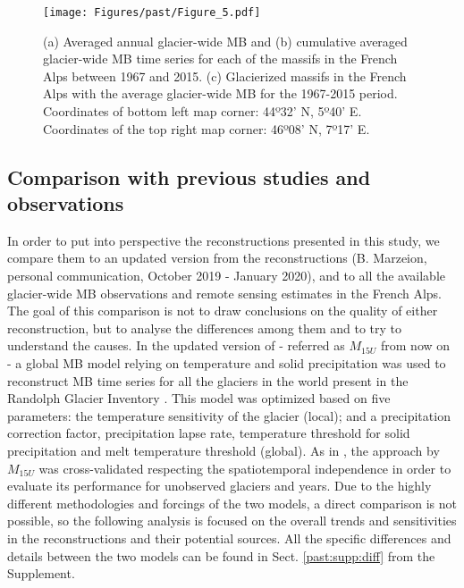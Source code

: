 \begin{figure}[t]
\centering
\texttt{[image: Figures/past/Figure\_5.pdf]}
\captionsetup{justification=centering}
\caption{(a) Averaged annual glacier-wide MB and (b) cumulative averaged glacier-wide MB time series for each of the massifs in the French Alps between 1967 and 2015. (c) Glacierized massifs in the French Alps with the average glacier-wide MB for the 1967-2015 period. Coordinates of bottom left map corner: 44º32' N, 5º40' E. Coordinates of the top right map corner: 46º08' N, 7º17' E.}
\label{past:fig5}
\end{figure}

\subsection{Comparison with previous studies and observations} \label{past:overview:comparison}

In order to put into perspective the reconstructions presented in this study, we compare them to an updated version from the \citet{marzeion_brief_2015} reconstructions (B. Marzeion, personal communication, October 2019 - January 2020), and to all the available glacier-wide MB observations and remote sensing estimates in the French Alps. The goal of this comparison is not to draw conclusions on the quality of either reconstruction, but to analyse the differences among them and to try to understand the causes. In the updated version of \citet{marzeion_brief_2015} - referred as $M_{15U}$ from now on -  a global MB model relying on temperature and solid precipitation was used to reconstruct MB time series for all the glaciers in the world present in the Randolph Glacier Inventory \citep{consortium_randolph_2017}. This model was optimized based on five parameters: the temperature sensitivity of the glacier (local); and a precipitation correction factor, precipitation lapse rate, temperature threshold for solid precipitation and melt temperature threshold (global). As in \citet{bolibar_deep_2020-1}, the approach by $M_{15U}$ was cross-validated respecting the spatiotemporal independence in order to evaluate its performance for unobserved glaciers and years. Due to the highly different methodologies and forcings of the two models, a direct comparison is not possible, so the following analysis is focused on the overall trends and sensitivities in the reconstructions and their potential sources. All the specific differences and details between the two models can be found in Sect. \ref{past:supp:diff} from the Supplement. 

